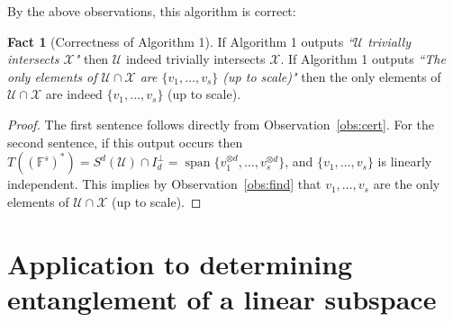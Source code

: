 \documentclass[11pt]{article}
\theoremstyle{definition}
\newtheorem{fact}[theorem]{Fact}
\newcommand{\field}{\mathbb{F}}
\newcommand\X{\mathcal{X}}
\newcommand\U{\mathcal{U}}
\DeclareMathOperator{\spn}{span}
\newcommand{\bnote}[1]{}
\begin{document}
By the above observations, this algorithm is correct:

\begin{fact}[Correctness of Algorithm 1]\label{fact:algorithm_correct}
If Algorithm 1 outputs {\em ``$\U$ trivially intersects $\X$"} then $\U$ indeed trivially intersects $\X$. If Algorithm 1 outputs {\em ``The only elements of $\U \cap \X$ are $\{v_1,\dots, v_s\}$ (up to scale)"} then the only elements of $\U \cap \X$ are indeed $\{v_1,\dots, v_s\}$ (up to scale).
\end{fact}
\begin{proof}
The first sentence follows directly from Observation~\ref{obs:cert}. For the second sentence, if this output occurs then $T((\field^s)^*)=S^d(\U)\cap I_d^{\perp}=\spn\{v_1^{\otimes d},\dots, v_s^{\otimes d}\}$, and $\{v_1,\dots, v_s\}$ is linearly independent. This implies by Observation~\ref{obs:find} that $v_1,\dots, v_s$ are the only elements of $\U \cap \X$ (up to scale).
\end{proof}





%
%


%





\section{Application to determining entanglement of a linear subspace} \label{sec:entanglement}
\end{document}
